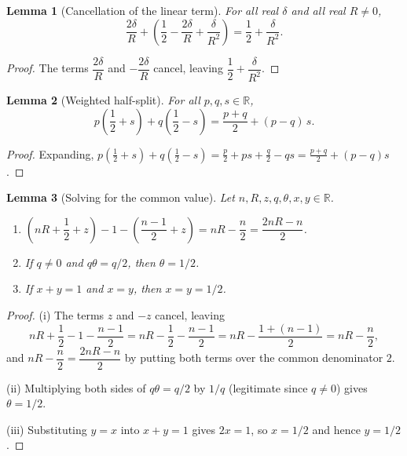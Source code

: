 \documentclass[11pt]{article}
\newtheorem{alemma}{Lemma}[section] %
\begin{document}
\begin{alemma}[Cancellation of the linear term]\label{alem:cancel}
For all real $\delta$ and all real $R\ne 0$,
\begin{equation}
  \frac{2\delta}{R}+\left(\frac12-\frac{2\delta}{R}+\frac{\delta}{R^2}\right)
  =\frac12+\frac{\delta}{R^2}.
\end{equation}
\end{alemma}

\begin{proof}
The terms $\dfrac{2\delta}{R}$ and $-\dfrac{2\delta}{R}$ cancel, leaving $\dfrac12+\dfrac{\delta}{R^2}$.
\end{proof}

\begin{alemma}[Weighted half-split]\label{alem:halfsplit}
For all $p,q,s\in\mathbb{R}$,
\begin{equation}
  p\left(\frac12+s\right)+q\left(\frac12-s\right)
  =\frac{p+q}{2}+(p-q)\,s.
\end{equation}
\end{alemma}

\begin{proof}
Expanding, $p\left(\tfrac12+s\right)+q\left(\tfrac12-s\right)=\tfrac p2+ps+\tfrac q2-qs=\tfrac{p+q}2+(p-q)s$.
\end{proof}

\begin{alemma}[Solving for the common value]\label{alem:common}
Let $n,R,z,q,\theta,x,y\in\mathbb{R}$.
\begin{enumerate}[label=(\roman*)]
\item $\left(nR+\dfrac12+z\right)-1-\left(\dfrac{n-1}{2}+z\right)=nR-\dfrac n2=\dfrac{2nR-n}{2}$.
\item If $q\ne 0$ and $q\theta=q/2$, then $\theta=1/2$.
\item If $x+y=1$ and $x=y$, then $x=y=1/2$.
\end{enumerate}
\end{alemma}

\begin{proof}
(i) The terms $z$ and $-z$ cancel, leaving
\begin{equation}
  nR+\frac12-1-\frac{n-1}{2}
  =nR-\frac12-\frac{n-1}{2}
  =nR-\frac{1+(n-1)}{2}
  =nR-\frac n2 ,
\end{equation}
and $nR-\dfrac n2=\dfrac{2nR-n}{2}$ by putting both terms over the common denominator $2$.

(ii) Multiplying both sides of $q\theta=q/2$ by $1/q$ (legitimate since $q\ne 0$) gives $\theta=1/2$.

(iii) Substituting $y=x$ into $x+y=1$ gives $2x=1$, so $x=1/2$ and hence $y=1/2$.
\end{proof}
\end{document}
